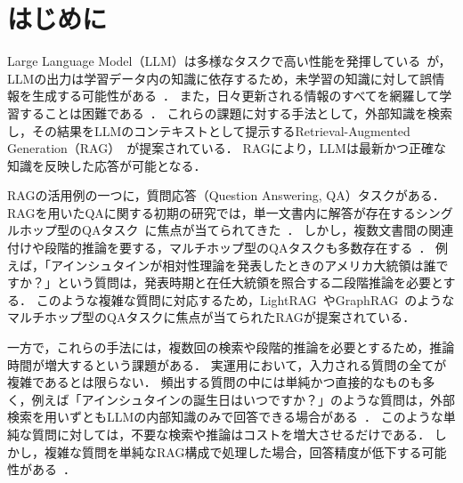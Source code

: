 \section{はじめに} \label{sec1}
Large Language Model（LLM）は多様なタスクで高い性能を発揮している~\cite{Zhao25}が，LLMの出力は学習データ内の知識に依存するため，未学習の知識に対して誤情報を生成する可能性がある~\cite{Ji23}．
また，日々更新される情報のすべてを網羅して学習することは困難である~\cite{Wang25}．
これらの課題に対する手法として，外部知識を検索し，その結果をLLMのコンテキストとして提示するRetrieval-Augmented Generation（RAG）~\cite{Lewis20}が提案されている．
RAGにより，LLMは最新かつ正確な知識を反映した応答が可能となる．

RAGの活用例の一つに，質問応答（Question Answering, QA）タスクがある．
RAGを用いたQAに関する初期の研究では，単一文書内に解答が存在するシングルホップ型のQAタスク~\cite{rajpurkar16}に焦点が当てられてきた~\cite{Shi24}．
しかし，複数文書間の関連付けや段階的推論を要する，マルチホップ型のQAタスクも多数存在する~\cite{yang18,ho20,trivedi22}．
例えば，「アインシュタインが相対性理論を発表したときのアメリカ大統領は誰ですか？」という質問は，発表時期と在任大統領を照合する二段階推論を必要とする．
このような複雑な質問に対応するため，LightRAG~\cite{Guo25}やGraphRAG~\cite{edge25}のようなマルチホップ型のQAタスクに焦点が当てられたRAGが提案されている．

一方で，これらの手法には，複数回の検索や段階的推論を必要とするため，推論時間が増大するという課題がある．
実運用において，入力される質問の全てが複雑であるとは限らない．
頻出する質問の中には単純かつ直接的なものも多く，例えば「アインシュタインの誕生日はいつですか？」のような質問は，外部検索を用いずともLLMの内部知識のみで回答できる場合がある~\cite{Mallen23}．
このような単純な質問に対しては，不要な検索や推論はコストを増大させるだけである．
しかし，複雑な質問を単純なRAG構成で処理した場合，回答精度が低下する可能性がある~\cite{LingjiaoChen24}．

